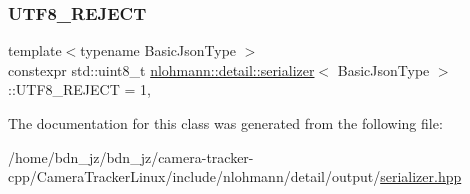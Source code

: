 \subsubsection{\texorpdfstring{U\+T\+F8\+\_\+\+R\+E\+J\+E\+CT}{UTF8\_REJECT}}
{\footnotesize\ttfamily template$<$typename Basic\+Json\+Type $>$ \\
constexpr std\+::uint8\+\_\+t \hyperlink{classnlohmann_1_1detail_1_1serializer}{nlohmann\+::detail\+::serializer}$<$ Basic\+Json\+Type $>$\+::U\+T\+F8\+\_\+\+R\+E\+J\+E\+CT = 1\hspace{0.3cm}{\ttfamily [static]}, {\ttfamily [private]}}



The documentation for this class was generated from the following file\+:\begin{DoxyCompactItemize}
\item 
/home/bdn\+\_\+jz/bdn\+\_\+jz/camera-\/tracker-\/cpp/\+Camera\+Tracker\+Linux/include/nlohmann/detail/output/\hyperlink{serializer_8hpp}{serializer.\+hpp}\end{DoxyCompactItemize}
